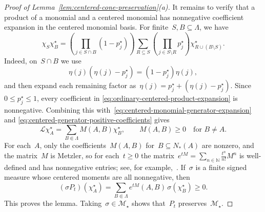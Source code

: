 \documentclass[EJP,preprint,NODS,nobera]{ejpecp}
\newcommand{\N}{\mathbb{N}}
\newcommand{\bb}[1]{\left(#1\right)}
\newcommand{\Lcal}{\mathcal{L}}
\begin{document}
\begin{proof}[Proof of Lemma~\ref{lem:centered-cone-preservation}\textup{(a)}]
It remains to verify that a product of a monomial and a centered monomial has nonnegative coefficient expansion in the centered monomial basis. For finite~$S,B\subseteq\Lambda$, we have
\begin{equation}
\label{eq:ordinary-centered-product-expansion}
\chi_S\chi_B^\star
=
\bb{\prod_{j\in S\cap B}\bb{1-p_j^\star}}
\sum_{R\subseteq S}
\bb{\prod_{j\in S\setminus R}p_j^\star}
\chi_{R\cup(B\setminus S)}^\star.
\end{equation}
Indeed, on~$S\cap B$ we use
\begin{equation*}
\eta(j)\bb{\eta(j)-p_j^\star}
=
\bb{1-p_j^\star}\eta(j),
\end{equation*}
and then expand each remaining factor as~$\eta(j)=p_j^\star+\bb{\eta(j)-p_j^\star}$. Since~$0\leq p_j^\star\leq1$, every coefficient in
\eqref{eq:ordinary-centered-product-expansion} is nonnegative. Combining this
with~\eqref{eq:centered-monomial-generator-expansion} and
\eqref{eq:centered-generator-positive-coefficients} gives
\begin{equation}
\label{eq:centered-generator-metzler}
\Lcal\chi_A^\star
=
\sum_{B\Subset\Lambda}M(A,B)\chi_B^\star,
\qquad
M(A,B)\geq0
\quad\text{for }B\neq A.
\end{equation}
For each~$A$, only the coefficients~$M(A,B)$ for~$B\subseteq N_*(A)$ are nonzero, and the matrix~$M$ is Metzler, so for each~$t\geq0$ the matrix~$e^{tM}=\sum_{n\in\N}\frac{t^n}{n!}M^n$ is well-defined and has nonnegative entries; see, for example,~\cite{ArendtEtAl1986}. If~$\sigma$ is a
finite signed measure whose centered moments are all nonnegative, then
\begin{equation*}
(\sigma P_t)(\chi_A^\star)
=
\sum_{B\Subset \Lambda}
e^{tM}(A,B)\,\sigma(\chi_B^\star)
\geq0.
\end{equation*}
This proves the lemma. Taking~$\sigma\in\mathcal M_\star$ shows that~$P_t$
preserves~$\mathcal M_\star$.
\end{proof}
\end{document}
